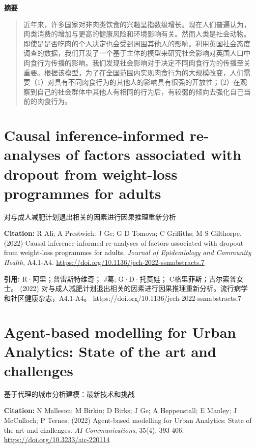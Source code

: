 \noindent\textbf{摘要}\par
\begin{quote}\small
近年来，许多国家对非肉类饮食的兴趣呈指数级增长。现在人们普遍认为，肉类消费的增加与更高的健康风险和环境影响有关。然而人类是社会动物。即使是是否吃肉的个人决定也会受到周围其他人的影响。利用英国社会态度调查的数据，我们开发了一个基于主体的模型来研究社会影响对英国人口中肉食行为传播的影响。我们发现社会影响对于决定不同肉食行为的传播至关重要。根据该模型，为了在全国范围内实现肉食行为的大规模改变，人们需要（1）对具有不同肉食行为的其他人的影响具有很强的开放性；（2）在观察到自己的社会群体中其他人有相同的行为后，有较弱的倾向去强化自己当前的肉食行为。
\end{quote}

\vspace{0.5em}
\chapter{Causal inference-informed re-analyses of factors associated with dropout from weight-loss programmes for adults}
\begin{center}\small 对与成人减肥计划退出相关的因素进行因果推理重新分析\end{center}

\noindent\textbf{Citation:} R Ali; A Prestwich; J Ge; G D Tomova; C Griffiths; M S Gilthorpe. (2022) Causal inference-informed re-analyses of factors associated with dropout from weight-loss programmes for adults. \textit{Journal of Epidemiology and Community Health}, A4.1-A4. \url{https://doi.org/10.1136/jech-2022-ssmabstracts.7}

\vspace{0.5em}
\noindent\textbf{引用:} R·阿里；普雷斯特维奇； J葛; G·D·托莫娃； C格里菲斯；吉尔索普女士。 (2022) 对与成人减肥计划退出相关的因素进行因果推理重新分析。流行病学和社区健康杂志，A4.1-A4。 https://doi.org/10.1136/jech-2022-ssmabstracts.7

\vspace{0.5em}
\chapter{Agent-based modelling for Urban Analytics: State of the art and challenges}
\begin{center}\small 基于代理的城市分析建模：最新技术和挑战\end{center}

\noindent\textbf{Citation:} N Malleson; M Birkin; D Birks; J Ge; A Heppenstall; E Manley; J McCulloch; P Ternes. (2022) Agent-based modelling for Urban Analytics: State of the art and challenges. \textit{AI Communications}, 35(4), 393-406. \url{https://doi.org/10.3233/aic-220114}

